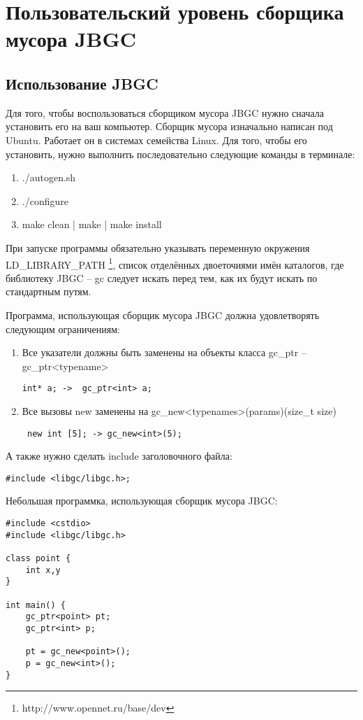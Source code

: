 \section {Пользовательский уровень сборщика мусора JBGC}

\subsection {Использование JBGC}
Для того, чтобы воспользоваться сборщиком мусора JBGC нужно сначала установить его на ваш компьютер. Сборщик мусора изначально написан под Ubuntu. Работает он в системах семейства Linux. Для того, чтобы его установить, нужно выполнить последовательно следующие команды в терминале:
\begin{enumerate}
\item ./autogen.sh
\item ./configure
\item make clean | make | make install
\end {enumerate}

При запуске программы обязательно указывать переменную окружения LD\_LIBRARY\_PATH \footnote{http://www.opennet.ru/base/dev}, список отделённых  двоеточиями  имён каталогов, где библиотеку JBGC -- gc следует искать перед  тем,  как  их  будут  искать  по стандартным путям.

Программа, использующая сборщик мусора JBGC должна удовлетворять следующим ограничениям:
\begin{enumerate}
\item Все указатели  должны быть заменены на  объекты класса gc\_ptr -- gc\_ptr<typename> \begin{lstlisting}int* a; ->  gc_ptr<int> a;
\end{lstlisting}
\item Все вызовы new заменены на gc\_new<typenames>(params)(size\_t size) \begin{lstlisting} new int [5]; -> gc_new<int>(5);
\end{lstlisting}
\end {enumerate}
А также нужно сделать include заголовочного файла:\begin{lstlisting}
#include <libgc/libgc.h>;
\end{lstlisting}

Небольшая программка, использующая сборщик мусора JBGC:
\begin{lstlisting}
#include <cstdio>
#include <libgc/libgc.h>

class point {
	int x,y
}

int main() {
	gc_ptr<point> pt;
	gc_ptr<int> p;

	pt = gc_new<point>();
	p = gc_new<int>();
}

\end{lstlisting}
